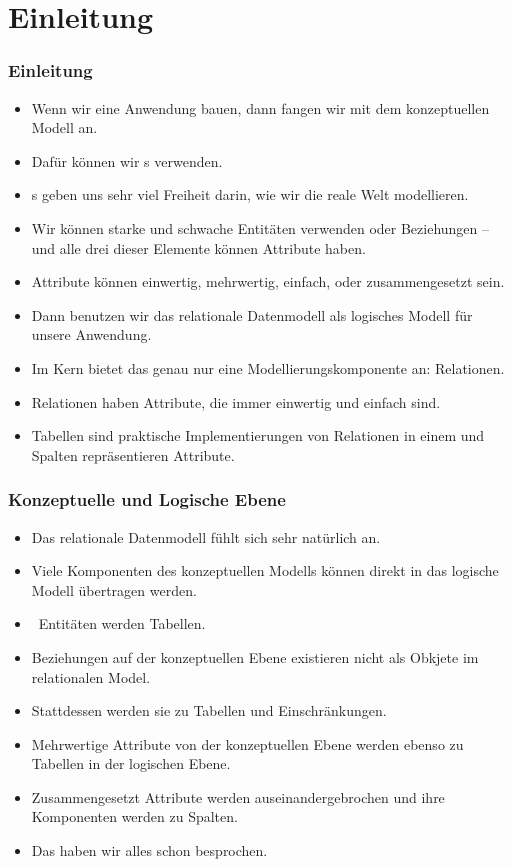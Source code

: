 \documentclass[aspectratio=169,mathserif,notheorems]{beamer}%
\subtitle{37.~Logisches Schema:~Schwache Entitäten}%
\begin{document}
%
%
\startPresentation%
%
\section{Einleitung}%
%
\begin{frame}%
\frametitle{Einleitung}%
\begin{itemize}%
\item Wenn wir eine Anwendung bauen, dann fangen wir mit dem konzeptuellen Modell an.%
%
\item<2-> Dafür können wir s verwenden.%
%
\item<3-> s geben uns sehr viel Freiheit darin, wie wir die reale Welt modellieren.%
%
\item<4-> Wir können starke und schwache Entitäten verwenden oder Beziehungen -- und alle drei dieser Elemente können Attribute haben.%
%
\item<5-> Attribute können einwertig, mehrwertig, einfach, oder zusammengesetzt sein.%
%
\item<6-> Dann benutzen wir das relationale Datenmodell als logisches Modell für unsere Anwendung.%
%
\item<7-> Im Kern bietet das genau nur eine Modellierungskomponente an: Relationen.%
%
\item<8-> Relationen haben Attribute, die immer einwertig und einfach sind.%
%
\item<9-> Tabellen sind praktische Implementierungen von Relationen in einem  und Spalten repräsentieren Attribute.%
%
\end{itemize}%
\end{frame}%
%
\begin{frame}%
\frametitle{Konzeptuelle und Logische Ebene}%
\begin{itemize}%
\item Das relationale Datenmodell fühlt sich sehr natürlich an.%
\item<2-> Viele Komponenten des konzeptuellen Modells können direkt in das logische Modell übertragen werden.%
\item<3-> \DEZB~Entitäten werden Tabellen.
%
\item<4-> Beziehungen auf der konzeptuellen Ebene existieren nicht als Obkjete im relationalen Model.
\item<5-> Stattdessen werden sie zu Tabellen und Einschränkungen.%
\item<6-> Mehrwertige Attribute von der konzeptuellen Ebene werden ebenso zu Tabellen in der logischen Ebene.%
\item<7-> Zusammengesetzt Attribute werden auseinandergebrochen und ihre Komponenten werden zu Spalten.%
\item<8-> Das haben wir alles schon besprochen.%
\end{itemize}%
\end{frame}%
\end{document}
